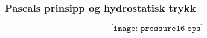 \documentclass[aspectratio=169,xcolor=dvipsnames]{beamer}
\begin{document}
%
%
%
%
%
%
\begin{frame}
	\frametitle{Pascals prinsipp og hydrostatisk trykk}

	$$\texttt{[image: pressure16.eps]}$$
\end{frame}
%
\end{document}

